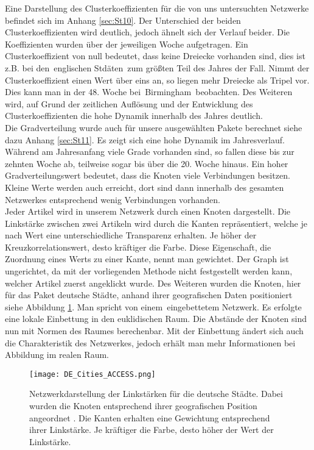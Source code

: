 \documentclass[fontsize=11pt, twoside, a4paper]{scrartcl}
\begin{document}
Eine Darstellung des Clusterkoeffizienten für die von uns untersuchten Netzwerke befindet sich im Anhang \ref{sec:St10}. Der Unterschied der beiden Clusterkoeffizienten wird deutlich, jedoch ähnelt sich der Verlauf beider. Die Koeffizienten wurden über der jeweiligen Woche aufgetragen. Ein Clusterkoeffizient von null bedeutet, dass keine Dreiecke vorhanden sind, dies ist z.B. bei den \,\glqq englischen Stdäten\grqq\, zum größten Teil des Jahres der Fall. Nimmt der Clusterkoeffizient einen Wert über eins an, so liegen mehr Dreiecke als Tripel vor. Dies kann man in der 48. Woche bei \,\glqq Birmingham\grqq\, beobachten. Des Weiteren wird, auf Grund der zeitlichen Auflösung und der Entwicklung des Clusterkoeffizienten die hohe Dynamik innerhalb des Jahres deutlich.\\[\baselineskip]
Die Gradverteilung wurde auch für unsere ausgewählten Pakete berechnet siehe dazu Anhang \ref{sec:St11}. Es zeigt sich eine hohe Dynamik im Jahresverlauf. Während am Jahresanfang viele Grade vorhanden sind, so fallen diese bis zur zehnten Woche ab, teilweise sogar bis über die 20. Woche hinaus. Ein hoher Gradverteilungswert bedeutet, dass die Knoten viele Verbindungen besitzen. Kleine Werte werden auch erreicht, dort sind dann innerhalb des gesamten Netzwerkes entsprechend wenig Verbindungen vorhanden.\\[\baselineskip]
Jeder Artikel wird in unserem Netzwerk durch einen Knoten dargestellt. Die Link\-stärke zwischen zwei Artikeln wird durch die Kanten repräsentiert, welche je nach Wert eine unterschiedliche Transparenz erhalten. Je höher der Kreuzkorrelationswert, desto kräftiger die Farbe. Diese Eigenschaft, die Zuordnung eines Werts zu einer Kante, nennt man gewichtet. Der Graph ist ungerichtet, da mit der vorliegenden Methode nicht festgestellt werden kann, welcher Artikel zuerst angeklickt wurde. Des Weiteren wurden die Knoten, hier für das Paket deutsche Städte, anhand ihrer geografischen Daten positioniert siehe Abbildung \ref{DE_Cities_ACCESS}. Man spricht von einem \,\glqq eingebettetem Netzwerk\grqq. Es erfolgte eine lokale Einbettung in den euklidischen Raum. Die Abstände der Knoten sind nun mit Normen des Raumes berechenbar. Mit der Einbettung ändert sich auch die Charakteristik des Netzwerkes, jedoch erhält man mehr Informationen bei Abbildung im realen Raum.
\begin{figure}[H]
	\centering
	\texttt{[image: DE\_Cities\_ACCESS.png]}

	\caption{Netzwerkdarstellung der Linkstärken für die deutsche Städte. Dabei wurden die Knoten entsprechend ihrer geografischen Position angeordnet \cite{GoogleMaps}. Die Kanten erhalten eine Gewichtung entsprechend ihrer Linkstärke. Je kräftiger die Farbe, desto höher der Wert der Linkstärke.}
		\label{DE_Cities_ACCESS}
\end{figure}
\end{document}
